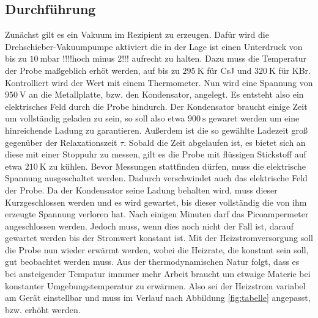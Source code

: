 \subsection{Durchführung}
Zunächst gilt es ein Vakuum im Rezipient zu erzeugen. Dafür wird die Drehschieber-Vakuumpumpe
aktiviert die in der Lage ist einen Unterdruck von bis zu $\SI{10}{\milli\bar}$ !!!!hoch minus 2!!! aufrecht zu halten.
Dazu muss die Temperatur der Probe maßgeblich erhöt werden, auf bis zu $\SI{295}{\kelvin}$ für 
CsJ und $\SI{320}{\kelvin}$ für KBr. Kontrolliert wird der Wert mit einem Thermometer.
Nun wird eine Spannung von $\SI{950}{\volt}$ an die Metallplatte, bzw. den Kondensator, angelegt. Es entsteht also ein elektrisches 
Feld durch die Probe hindurch. Der Kondensator braucht einige Zeit um vollständig geladen zu sein,
so soll also etwa $\SI{900}{\second}$ gewaret werden um eine hinreichende Ladung zu garantieren.
Außerdem ist die so gewählte Ladezeit groß gegenüber der Relaxationszeit $\tau$.
Sobald die Zeit abgelaufen ist, es bietet sich an diese mit einer Stoppuhr zu messen,
gilt es die Probe mit flüssigen Stickstoff auf etwa $\SI{210}{\kelvin}$ zu kühlen.
Bevor Messungen stattfinden dürfen, muss die elektrische Spannung ausgeschaltet werden.
Dadurch verschwindet auch das elektrische Feld der Probe. Da der Kondensator seine Ladung behalten wird,
muss dieser Kurzgeschlossen werden und es wird gewartet, bis dieser vollständig die von ihm erzeugte Spannung verloren hat.
Nach einigen Minuten darf das Picoampermeter angeschlossen werden. Jedoch muss,
wenn dies noch nicht der Fall ist, darauf gewartet werden bis der Stromwert konstant ist.
Mit der Heizstromversorgung soll die Probe nun wieder erwärmt werden, wobei die 
Heizrate, die konstant sein soll, gut beobachtet werden muss. Aus der thermodynamischen Natur 
folgt, dass es bei ansteigender Tempatur immmer mehr Arbeit braucht um etwaige Materie bei 
konstanter Umgebungstemperatur zu erwärmen. Also sei der Heizstrom variabel am Gerät
einstellbar und muss im Verlauf nach Abbildung \ref{fig:tabelle} angepasst, bzw. erhöht werden.


